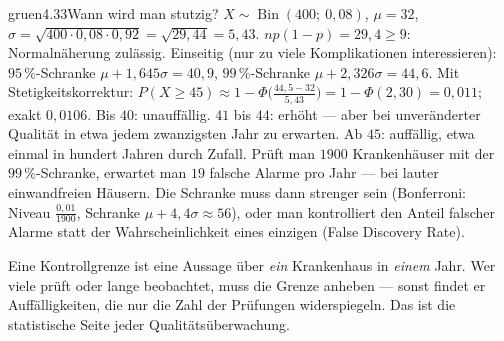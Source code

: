 \begin{loesungkarte}{gruen}{4.33}{Wann wird man stutzig?}
$X\sim\operatorname{Bin}(400;\ 0{,}08)$, $\mu = 32$, $\sigma = \sqrt{400\cdot0{,}08\cdot0{,}92} = \sqrt{29{,}44} = 5{,}43$. $np(1 - p) = 29{,}4\ge9$: Normalnäherung zulässig.
Einseitig (nur zu viele Komplikationen interessieren): $95\,\%$-Schranke $\mu + 1{,}645\sigma = 40{,}9$, $99\,\%$-Schranke $\mu + 2{,}326\sigma = 44{,}6$. Mit Stetigkeitskorrektur: $P(X\ge45)\approx1 - \Phi\bigl(\frac{44{,}5 - 32}{5{,}43}\bigr) = 1 - \Phi(2{,}30) = 0{,}011$; exakt $0{,}0106$.
Bis $40$: unauffällig. $41$ bis $44$: erhöht --- aber bei unveränderter Qualität in etwa jedem zwanzigsten Jahr zu erwarten. Ab $45$: auffällig, etwa einmal in hundert Jahren durch Zufall.
Prüft man $1900$ Krankenhäuser mit der $99\,\%$-Schranke, erwartet man $19$ falsche Alarme pro Jahr --- bei lauter einwandfreien Häusern. Die Schranke muss dann strenger sein (Bonferroni: Niveau $\frac{0{,}01}{1900}$, Schranke $\mu + 4{,}4\sigma\approx56$), oder man kontrolliert den Anteil falscher Alarme statt der Wahrscheinlichkeit eines einzigen (False Discovery Rate).
\begin{mitnehmen}\kastentext
Eine Kontrollgrenze ist eine Aussage über \emph{ein} Krankenhaus in \emph{einem} Jahr. Wer viele prüft oder lange beobachtet, muss die Grenze anheben --- sonst findet er Auffälligkeiten, die nur die Zahl der Prüfungen widerspiegeln. Das ist die statistische Seite jeder Qualitätsüberwachung.
\end{mitnehmen}
\end{loesungkarte}

